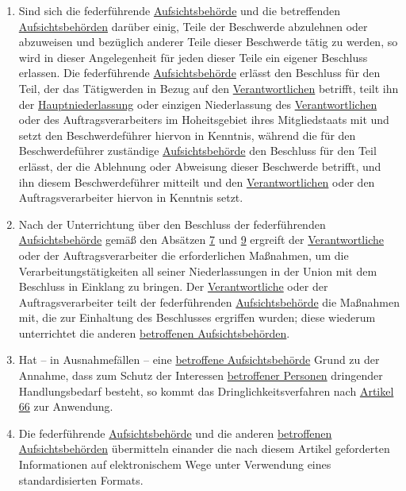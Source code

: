\begin{enumerate}
  \item Sind sich die federführende \hyperref[itm:04-21]{Aufsichtsbehörde} und die betreffenden \hyperref[itm:04-21]{Aufsichtsbehörden} darüber einig, Teile der
   Beschwerde abzulehnen oder abzuweisen und bezüglich anderer Teile dieser Beschwerde tätig zu werden, so wird in
   dieser Angelegenheit für jeden dieser Teile ein eigener Beschluss erlassen. Die federführende \hyperref[itm:04-21]{Aufsichtsbehörde}
   erlässt den Beschluss für den Teil, der das Tätigwerden in Bezug auf den \hyperref[itm:04-7]{Verantwortlichen} betrifft, teilt ihn der
   \hyperref[itm:04-16]{Hauptniederlassung} oder einzigen Niederlassung des \hyperref[itm:04-7]{Verantwortlichen} oder des Auftragsverarbeiters im Hoheitsgebiet
   ihres Mitgliedstaats mit und setzt den Beschwerdeführer hiervon in Kenntnis, während die für den Beschwerdeführer
   zuständige \hyperref[itm:04-21]{Aufsichtsbehörde} den Beschluss für den Teil erlässt, der die Ablehnung oder Abweisung dieser Beschwerde
   betrifft, und ihn diesem Beschwerdeführer mitteilt und den \hyperref[itm:04-7]{Verantwortlichen} oder den Auftragsverarbeiter hiervon in
   Kenntnis setzt.
  \label{itm:60-9}

  \item Nach der Unterrichtung über den Beschluss der federführenden \hyperref[itm:04-21]{Aufsichtsbehörde} gemäß den Absätzen \hyperref
   [itm:60-7]{7} und \hyperref[itm:60-9]{9} ergreift der \hyperref[itm:04-7]{Verantwortliche} oder der Auftragsverarbeiter die
   erforderlichen Maßnahmen, um die Verarbeitungstätigkeiten all seiner Niederlassungen in der Union mit dem Beschluss
   in Einklang zu bringen. Der \hyperref[itm:04-7]{Verantwortliche} oder der Auftragsverarbeiter teilt der federführenden \hyperref[itm:04-21]{Aufsichtsbehörde}
   die Maßnahmen mit, die zur Einhaltung des Beschlusses ergriffen wurden; diese wiederum unterrichtet die anderen
   \hyperref[itm:04-22]{betroffenen Aufsichtsbehörden}.
  \label{itm:60-10}

  \item Hat -- in Ausnahmefällen -- eine \hyperref[itm:04-22]{betroffene Aufsichtsbehörde} Grund zu der Annahme, dass zum Schutz der
   Interessen \hyperref[itm:04-1]{betroffener Personen} dringender Handlungsbedarf besteht, so kommt das Dringlichkeitsverfahren nach
   \hyperref[ch:66]{Artikel 66} zur Anwendung.
  \label{itm:60-11}

  \item Die federführende \hyperref[itm:04-21]{Aufsichtsbehörde} und die anderen \hyperref[itm:04-22]{betroffenen Aufsichtsbehörden} übermitteln einander die nach
   diesem Artikel geforderten Informationen auf elektronischem Wege unter Verwendung eines standardisierten Formats.
  \label{itm:60-12}

\end{enumerate}


